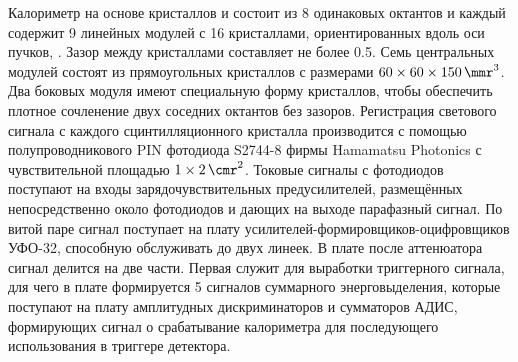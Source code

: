 Калориметр на основе кристаллов  и  состоит из 8 одинаковых октантов и каждый содержит 9 линейных модулей с \num{16} кристаллами, ориентированных вдоль оси пучков,
\cite{Aulchenko:2015msa}.
Зазор между кристаллами составляет не более \SI{0.5}{\mmr}.
Семь центральных модулей состоят из прямоугольных кристаллов с размерами $60 \times 60 \times \SI{150}{ \cubic\mmr}$.
Два боковых модуля имеют специальную форму кристаллов, чтобы обеспечить плотное сочленение двух соседних октантов без зазоров. 
Регистрация светового сигнала с каждого сцинтилляционного кристалла производится с помощью полупроводникового PIN фотодиода S2744-8 фирмы Hamamatsu Photonics с чувствительной площадью $1 \times \SI{2}{\square\cmr}$. 
Токовые сигналы с фотодиодов поступают на входы зарядочувствительных предусилителей,
размещённых непосредственно около фотодиодов и дающих на выходе парафазный сигнал.
По витой паре сигнал поступает на плату усилителей-формировщиков-оцифровщиков УФО-32,
способную обслуживать до двух линеек.
В плате после аттенюатора сигнал делится на две части.
Первая служит для выработки триггерного сигнала,
для чего в плате формируется \num{5} сигналов суммарного энерговыделения,
которые поступают на плату амплитудных дискриминаторов и сумматоров АДИС,
формирующих сигнал о срабатывание калориметра для последующего использования в триггере детектора.



